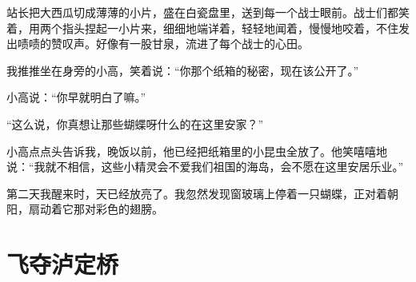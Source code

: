 \documentclass[12pt,UTF-8,openany]{ctexbook}
\begin{document}
\begin{large}
    站长把大西瓜切成薄薄的小片，盛在白瓷盘里，送到每一个战士眼前。战士们都笑着，用两个指头捏起一小片来，细细地端详着，轻轻地闻着，慢慢地咬着，不住发出啧啧的赞叹声。好像有一股甘泉，流进了每个战士的心田。
    
    我推推坐在身旁的小高，笑着说：“你那个纸箱的秘密，现在该公开了。”
    
    小高说：“你早就明白了嘛。”
    
    “这么说，你真想让那些蝴蝶呀什么的在这里安家？”
    
    小高点点头告诉我，晚饭以前，他已经把纸箱里的小昆虫全放了。他笑嘻嘻地说：“我就不相信，这些小精灵会不爱我们祖国的海岛，会不愿在这里安居乐业。”
    
    第二天我醒来时，天已经放亮了。我忽然发现窗玻璃上停着一只蝴蝶，正对着朝阳，扇动着它那对彩色的翅膀。
    
\end{large}



\chapter{飞夺泸定桥}
\end{document}
